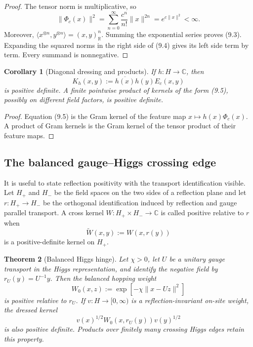 \documentclass[11pt]{article}
\newtheorem{theorem}{Theorem}[section]
\newtheorem{corollary}[theorem]{Corollary}
\theoremstyle{remark}
\begin{document}
\begin{proof}
The tensor norm is multiplicative, so
\[
 \|\Phi_c(x)\|^2
 =\sum_{n=0}^{\infty}\frac{c^n}{n!}\|x\|^{2n}
 =e^{c\|x\|^2}<\infty.
\]
Moreover,
\(\langle x^{\otimes n},y^{\otimes n}\rangle=(x,y)_{\mathbb R}^n\).
Summing the exponential series proves (9.3).  Expanding the squared norms
in the right side of (9.4) gives its left side term by term.  Every summand
is nonnegative.
\end{proof}

\begin{corollary}[Diagonal dressing and products]
\label{cor:v19v6-dressing}
If \(h:H\to\mathbb C\), then
\[
 K_h(x,y):=\overline{h(x)}h(y)E_c(x,y)                         \tag{9.5}
\]
is positive definite.  A finite pointwise product of kernels of the form
(9.5), possibly on different field factors, is positive definite.
\end{corollary}

\begin{proof}
Equation (9.5) is the Gram kernel of the feature map
\(x\mapsto h(x)\Phi_c(x)\).  A product of Gram kernels is the Gram kernel of
the tensor product of their feature maps.
\end{proof}

\subsection{The balanced gauge--Higgs crossing edge}

It is useful to state reflection positivity with the transport
identification visible.  Let \(H_+\) and \(H_-\) be the field spaces on the
two sides of a reflection plane and let \(r:H_+\to H_-\) be the orthogonal
identification induced by reflection and gauge parallel transport.  A
cross kernel \(W:H_+\times H_-\to\mathbb C\) is called positive relative to
\(r\) when
\[
 \widetilde W(x,y):=W(x,r(y))                                  \tag{9.6}
\]
is a positive-definite kernel on \(H_+\).

\begin{theorem}[Balanced Higgs hinge]
\label{thm:v19v6-balanced}
Let \(\chi>0\), let \(U\) be a unitary gauge transport in the Higgs
representation, and identify the negative field by \(r_U(y)=U^{-1}y\).
Then the balanced hopping weight
\[
 W_0(x,z):=\exp\!\left[-\chi\|x-Uz\|^2\right]                  \tag{9.7}
\]
is positive relative to \(r_U\).  If \(v:H\to[0,\infty)\) is a
reflection-invariant on-site weight, the dressed kernel
\[
 v(x)^{1/2}W_0(x,r_U(y))v(y)^{1/2}                             \tag{9.8}
\]
is also positive definite.  Products over finitely many crossing Higgs
edges retain this property.
\end{theorem}
\end{document}
